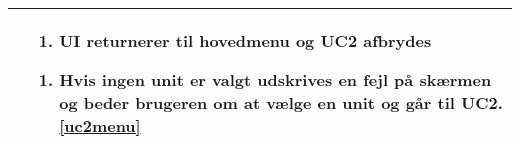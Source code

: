 \begin{table}[H]
\begin{tabular} {|p{6cm}|p{8cm}|}
		&\begin{enumerate}[label= \ref{uc2act}a.]
			\item UI returnerer til hovedmenu og UC2 afbrydes
		\end{enumerate}						
							
		\begin{enumerate}[label= \ref{uc2sysact}a.]
			\item Hvis ingen unit er valgt udskrives en fejl på skærmen og beder brugeren om at vælge en unit og går til UC2.\ref{uc2menu}
		\end{enumerate} \\\hline
											

	\end{tabular}
	\label{UC2} 
\end{table}